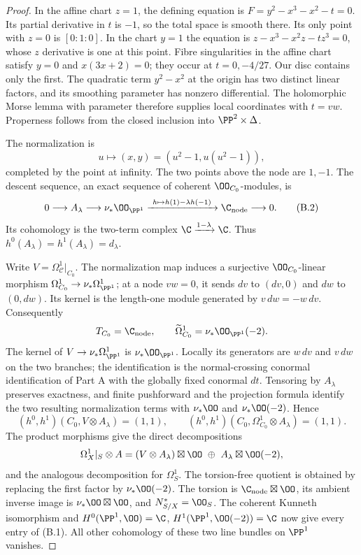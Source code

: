 \begin{proof}
In the affine chart $z=1$, the defining equation is $F=y^2-x^3-x^2-t=0$. Its partial derivative in $t$ is $-1$, so the total space is smooth there. Its only point with $z=0$ is $[0:1:0]$. In the chart $y=1$ the equation is $z-x^3-x^2z-tz^3=0$, whose $z$ derivative is one at this point. Fibre singularities in the affine chart satisfy $y=0$ and $x(3x+2)=0$; they occur at $t=0,-4/27$. Our disc contains only the first. The quadratic term $y^2-x^2$ at the origin has two distinct linear factors, and its smoothing parameter has nonzero differential. The holomorphic Morse lemma with parameter therefore supplies local coordinates with $t=vw$. Properness follows from the closed inclusion into $\PP^2\times\Delta$.

The normalization is
\[
 u\longmapsto(x,y)=(u^2-1,u(u^2-1)),
\]
completed by the point at infinity. The two points above the node are $1,-1$. The descent sequence, an exact sequence of coherent $\OO_{C_0}$-modules, is
\[
0\longrightarrow A_\lambda\longrightarrow\nu_*\OO_{\PP^1}
 \xrightarrow{\ h\mapsto h(1)-\lambda h(-1)\ }\C_{\rm node}
 \longrightarrow0.                                      \tag{B.2}
\]
Its cohomology is the two-term complex $\C\xrightarrow{1-\lambda}\C$. Thus $h^0(A_\lambda)=h^1(A_\lambda)=d_\lambda$.

Write $V=\Omega^1_{\mathcal C}|_{C_0}$. The normalization map induces a surjective $\OO_{C_0}$-linear morphism $\Omega^1_{C_0}\to\nu_*\Omega^1_{\PP^1}$; at a node $vw=0$, it sends $dv$ to $(dv,0)$ and $dw$ to $(0,dw)$. Its kernel is the length-one module generated by $v\,dw=-w\,dv$. Consequently
\[
 T_{C_0}=\C_{\rm node},\qquad
 \widetilde\Omega^1_{C_0}=\nu_*\OO_{\PP^1}(-2).
\]
The kernel of $V\to\nu_*\Omega^1_{\PP^1}$ is $\nu_*\OO_{\PP^1}$. Locally its generators are $w\,dv$ and $v\,dw$ on the two branches; the identification is the normal-crossing conormal identification of Part A with the globally fixed conormal $dt$. Tensoring by $A_\lambda$ preserves exactness, and finite pushforward and the projection formula identify the two resulting normalization terms with $\nu_*\OO$ and $\nu_*\OO(-2)$. Hence
\[
 (h^0,h^1)(C_0,V\otimes A_\lambda)=(1,1),\qquad
 (h^0,h^1)(C_0,\Omega^1_{C_0}\otimes A_\lambda)=(1,1).
\]
The product morphisms give the direct decompositions
\[
 \Omega^1_X|_S\otimes A
 =(V\otimes A_\lambda)\boxtimes\OO
 \ \oplus\ A_\lambda\boxtimes\OO(-2),
\]
and the analogous decomposition for $\Omega^1_S$. The torsion-free quotient is obtained by replacing the first factor by $\nu_*\OO(-2)$. The torsion is $\C_{\rm node}\boxtimes\OO$, its ambient inverse image is $\nu_*\OO\boxtimes\OO$, and $N^*_{S/X}=\OO_S$. The coherent Kunneth isomorphism and $H^0(\PP^1,\OO)=\C$, $H^1(\PP^1,\OO(-2))=\C$ now give every entry of (B.1). All other cohomology of these two line bundles on $\PP^1$ vanishes.


\end{proof}
